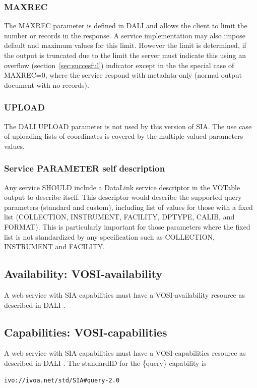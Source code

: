 \documentclass[11pt,a4paper]{ivoa}
\begin{document}
\subsubsection{MAXREC}
The MAXREC parameter is defined in DALI and allows the client to limit the number or records in the response. A service implementation may also impose default and maximum values for this limit. However the limit is determined, if the output is truncated due to the limit the server must indicate this using an overflow  (section~\ref{sec:succesful}) indicator except in the the special case of MAXREC=0, where the  service respond with metadata-only (normal output document with no records).

\subsubsection{UPLOAD}
 The DALI UPLOAD parameter is not used by this version of SIA. The use case of uploading lists of coordinates is covered by the multiple-valued parameters values.

\subsubsection{Service PARAMETER self description}
\label{sec:selfdesc}
Any service SHOULD  include a DataLink service descriptor in the VOTable output to describe itself. 
This descriptor would describe the supported query parameters (standard and custom), including list 
of values for those with a fixed list (COLLECTION, INSTRUMENT, FACILITY, DPTYPE, CALIB, and FORMAT).
This is particularly important for those parameters where the fixed list is not standardized by any
specification such as COLLECTION, INSTRUMENT and FACILITY.

\subsection{Availability: VOSI-availability}
A web service with SIA capabilities must have a VOSI-availability resource \citep{std:VOSI}  as described in DALI .
\subsection{Capabilities: VOSI-capabilities}
A web service with SIA capabilities must have a VOSI-capabilities resource \citep{std:VOSI} as described in DALI . The standardID for the \{query\} capability is 

\begin{lstlisting}
ivo://ivoa.net/std/SIA#query-2.0
\end{lstlisting}
\end{document}
